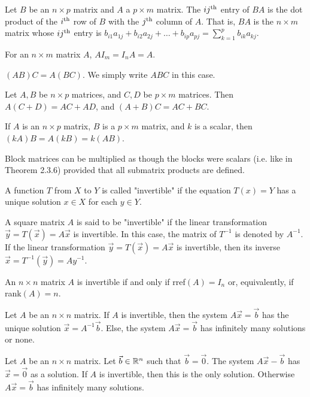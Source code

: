 \documentclass[a4paper,11pt]{article}
\begin{document}
\begin{outline}
    Let \(B\) be an \(n \times p\) matrix and \(A\) a \(p \times m\) matrix. The \(ij\textsuperscript{th}\) entry
    of \(BA\) is the dot product of the \(i\textsuperscript{th}\) row of \(B\) with the \(j\textsuperscript{th}\) column
    of \(A\). That is, \(BA\) is the \(n \times m\) matrix whose \(ij\textsuperscript{th}\) entry is \(b_{i1}a_{1j} +
    b_{i2}a_{2j} + \ldots + b_{ip}a_{pj} = \sum_{k=1}^p b_{ik}a_{kj}\).
    
    For an \(n \times m\) matrix \(A\), \(AI_m = I_nA = A\).
    
    \((AB)C = A(BC)\). We simply write \(ABC\) in this case.
    
    Let \(A, B\) be \(n \times p\) matrices, and \(C,D\) be \(p \times m\) matrices. Then \(A(C + D) = AC + AD\),
    and \((A + B)C = AC + BC\).
    
    If \(A\) is an \(n \times p\) matrix, \(B\) is a \(p \times m\) matrix, and \(k\) is a scalar, then \((kA)B =
    A(kB) = k(AB)\).
    
    Block matrices can be multiplied as though the blocks were scalars (i.e. like in Theorem 2.3.6) provided 
    that all submatrix products are defined.
    
    A function \(T\) from \(X\) to \(Y\) is called "invertible" if the equation \(T(x) = Y\) has a unique solution
    \(x \in X\) for each \(y \in Y\).
    
    A square matrix \(A\) is said to be "invertible" if the linear transformation \(\vec{y} = T(\vec{x}) = A\vec{x}\)
    is invertible. In this case, the matrix of \(T^{-1}\) is denoted by \(A^{-1}\). If the linear transformation 
    \(\vec{y} = T(\vec{x}) = A\vec{x}\) is invertible, then its inverse \(\vec{x} = T^{-1}(\vec{y}) = Ay^{-1}\).
    
    An \(n \times n\) matrix \(A\) is invertible if and only if rref\((A) = I_n\) or, equivalently, if 
    rank\((A) = n\).
    
    Let \(A\) be an \(n \times n\) matrix. If \(A\) is invertible, then the system \(A\vec{x}=\vec{b}\) has
    the unique solution \(\vec{x} = A^{-1}\vec{b}\). Else, the system \(A\vec{x} = \vec{b}\) has infinitely
    many solutions or none.
    
    Let \(A\) be an \(n \times n\) matrix. Let \(\vec{b} \in \mathbb{R}^n\) such that \(\vec{b} = \vec{0}\).
    The system \(A\vec{x} - \vec{b}\) has \(\vec{x} = \vec{0}\) as a solution. If \(A\) is invertible, then
    this is the only solution. Otherwise \(A\vec{x} = \vec{b}\) has infinitely many solutions.
    

\end{outline}
\end{document}
